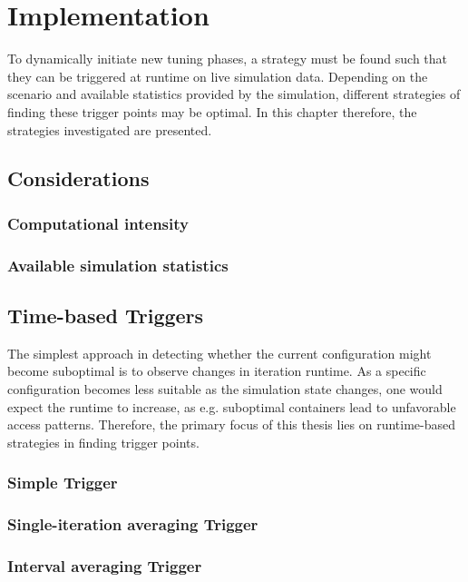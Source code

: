 \chapter[Implementation]{Implementation}
\label{cp:implementation}

{
\parindent0pt
To dynamically initiate new tuning phases, a strategy must be found such that they can be triggered at runtime on live simulation data. Depending on the scenario and available statistics provided by the simulation, different strategies of finding these trigger points may be optimal. In this chapter therefore, the strategies investigated are presented.
}

\section{Considerations}
\subsection{Computational intensity}
\subsection{Available simulation statistics}

\section{Time-based Triggers}

The simplest approach in detecting whether the current configuration might become suboptimal is to observe changes in iteration runtime. As a specific configuration becomes less suitable as the simulation state changes, one would expect the runtime to increase, as e.g. suboptimal containers lead to unfavorable access patterns. Therefore, the primary focus of this thesis lies on runtime-based strategies in finding trigger points.

\subsection{Simple Trigger}

\subsection{Single-iteration averaging Trigger}

\subsection{Interval averaging Trigger}

